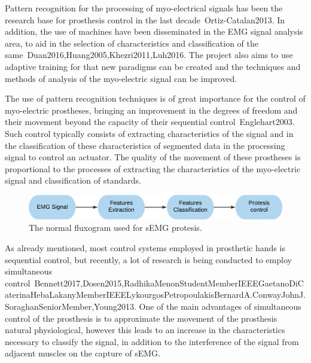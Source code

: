 \documentclass[a4paper, 12pt]{ppgeb}
\begin{document}
Pattern recognition for the processing of myo-electrical signals has
been the research base for prosthesis control in the last decade~\cite{mainreferences}{Ortiz-Catalan2013}. In addition, the use of
machines have been disseminated in the \ac{EMG} signal analysis area, to aid in the selection of characteristics and classification of the same~\cite{mainreferences}{Duan2016,Huang2005,Khezri2011,Luh2016}. The project also aims to use adaptive training for that new paradigms can be created and the techniques and methods of analysis of the myo-electric signal can be improved.

The use of pattern recognition techniques is of great importance
for the control of myo-electric prostheses, bringing an improvement in the degrees of freedom and their movement beyond the capacity of their sequential control~\cite{mainreferences}{Englehart2003}. Such control typically consists of extracting characteristics of the signal and in the classification of these characteristics of segmented data in the processing signal to control an actuator. The quality of the movement of these prostheses is proportional to the processes of extracting the characteristics of the myo-electric signal and classification of standards.

\begin{figure}[h]
	\centering
	\includegraphics[width=.8\linewidth]{normal_fluxogram.png}
	\caption{The normal fluxogram used for \ac{sEMG} protesis.} \label{fig_norm_flux}
\end{figure}

As already mentioned, most control systems employed in prosthetic hands is sequential control, but recently, a lot of research is being conducted to employ simultaneous control~\cite{mainreferences}{Bennett2017,Dosen2015,RadhikaMenonStudentMemberIEEEGaetanoDiCaterinaHebaLakanyMemberIEEELykourgosPetropoulakisBernardA.ConwayJohnJ.SoraghanSeniorMember,Young2013}. One of the main advantages of simultaneous control of the prosthesis is to approximate the movement of the prosthesis natural physiological, however this leads to an increase in the characteristics necessary to classify the signal, in addition to the interference of the signal from adjacent muscles on the capture of \ac{sEMG}.
\end{document}
